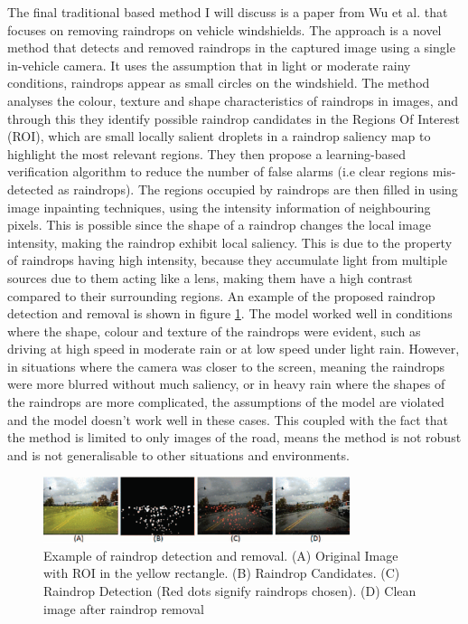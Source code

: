 \documentclass[11pt]{ociamthesis}  %
\begin{document}
The final traditional based method I will discuss is a paper from Wu et al.\cite{WuEtAl6467016} that focuses on removing raindrops on vehicle windshields. The approach is a novel method that detects and removed raindrops in the captured image using a single in-vehicle camera. It uses the assumption that in light or moderate rainy conditions, raindrops appear as small circles on the windshield. The method analyses the colour, texture and shape characteristics of raindrops in images, and through this they identify possible raindrop candidates in the Regions Of Interest (ROI), which are small locally salient droplets in a raindrop saliency map\cite{SaliencyMapenwiki:1276598565} to highlight the most relevant regions. They then propose a learning-based verification algorithm to reduce the number of false alarms (i.e clear regions mis-detected as raindrops). The regions occupied by raindrops are then filled in using image inpainting techniques, using the intensity information of neighbouring pixels. This is possible since the shape of a raindrop changes the local image intensity, making the raindrop exhibit local saliency. This is due to the property of raindrops having high intensity, because they accumulate light from multiple sources due to them acting like a lens, making them have a high contrast compared to their surrounding regions. An example of the proposed raindrop detection and removal is shown in figure \ref{Figure: Wu et al. Raindrop removal proposal}. The model worked well in conditions where the shape, colour and texture of the raindrops were evident, such as driving at high speed in moderate rain or at low speed under light rain. However, in situations where the camera was closer to the screen, meaning the raindrops were more blurred without much saliency, or in heavy rain where the shapes of the raindrops are more complicated, the assumptions of the model are violated and the model doesn't work well in these cases. This coupled with the fact that the method is limited to only images of the road, means the method is not robust and is not generalisable to other situations and environments.

\begin{figure}[h]
    \centering
    \includegraphics[width=0.8\textwidth]{figures/Wu et al Raindrop removal proposal.png}
    \caption{Example of raindrop detection and removal. (A) Original Image with ROI in the yellow rectangle. (B) Raindrop Candidates. (C) Raindrop Detection (Red dots signify raindrops chosen). (D) Clean image after raindrop removal } 
    \label{Figure: Wu et al. Raindrop removal proposal}
\end{figure}
\end{document}
